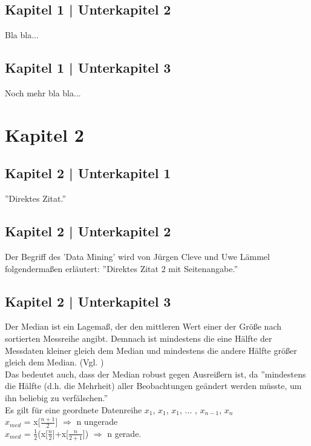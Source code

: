 \documentclass[deutsch]{lib/llncs/llncs}
\begin{document}
\subsection{Kapitel 1 | Unterkapitel 2}
Bla bla...


\subsection{Kapitel 1 | Unterkapitel 3}
Noch mehr bla bla...


\section{Kapitel 2}
\subsection{Kapitel 2 | Unterkapitel 1}
''Direktes Zitat.''\cite{Zitat09}\\


\subsection{Kapitel 2 | Unterkapitel 2}
Der Begriff des 'Data Mining' wird von Jürgen Cleve und Uwe Lämmel folgendermaßen erläutert: ''Direktes Zitat 2 mit Seitenangabe.'' \cite[p. 2]{Zitat01} \\


\subsection{Kapitel 2 | Unterkapitel 3}
Der Median ist ein Lagemaß, der den mittleren Wert einer der Größe nach sortierten Messreihe angibt. Demnach ist mindestens die eine Hälfte der Messdaten kleiner gleich dem Median und mindestens die andere Hälfte größer gleich dem Median. (Vgl. \cite[p. 23]{Zitat03})\\
Das bedeutet auch, dass der Median robust gegen Ausreißern ist, da ''mindestens die Hälfte (d.h. die Mehrheit) aller Beobachtungen geändert werden müsste, um ihn beliebig zu verfälschen.''\cite[p. 27]{Zitat03}\\
Es gilt für eine geordnete Datenreihe $x_{1}$, $x_{1}$, $x_{1}$, ... , $x_{n-1}$, $x_{n}$
\\
$x_{med}$ = x[$\frac{n+1}{2}$] $\Rightarrow$ n ungerade \\
$x_{med}$ = $\frac{1}{2}$(x[$\frac{n}{2}$]+x[$\frac{n}{2+1}$]) $\Rightarrow$ n gerade. 




\end{document}
